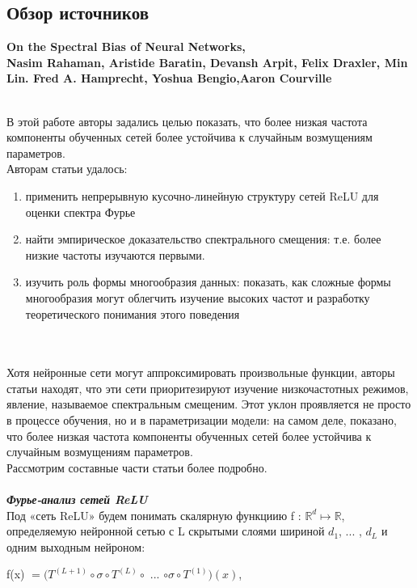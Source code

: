 \documentclass{article}
\begin{document}
    \newpage
    \begin{center} 
    \section{Обзор источников}
    \large \textbf {On the Spectral Bias of Neural Networks, \\ Nasim Rahaman, Aristide Baratin, Devansh Arpit, Felix Draxler, Min Lin. Fred A. Hamprecht, Yoshua Bengio,Aaron Courville}    
    \end{center}
    \\
    \large 
    В этой работе авторы задались целью показать, что более низкая частота компоненты обученных сетей более устойчива к случайным возмущениям параметров. 
    \\
    Авторам статьи удалось:
    \begin{enumerate}
    \item применить непрерывную кусочно-линейную структуру сетей ReLU для оценки спектра Фурье
    \item найти эмпирическое доказательство спектрального смещения: т.е. более низкие частоты изучаются первыми. 
    \item изучить роль формы многообразия данных: показать, как сложные формы многообразия могут облегчить изучение высоких частот и разработку теоретического понимания этого поведения
    \end{enumerate}
    \\ \\
    Хотя нейронные сети могут аппроксимировать произвольные функции, авторы статьи находят, что эти сети приоритезируют изучение низкочастотных режимов, явление, называемое спектральным смещеним. Этот уклон проявляется не просто в процессе обучения, но и в параметризации модели: на самом деле, показано, что более низкая частота компоненты обученных сетей более устойчива к случайным возмущениям параметров.
    \\
    Рассмотрим составные части статьи более подробно.
    \\ \\
    \textbf {\textit{Фурье-анализ сетей ReLU}}
    \\
    Под «сеть ReLU» будем понимать скалярную функциию f : ${\mathbb{R}}^{d} \mapsto {\mathbb{R}}$, определяемую нейронной сетью с L скрытыми слоями шириной $d_1$, ... , $d_L$ и одним выходным нейроном:
    \\
    \begin{center} 
    f(x) $= (T^{(L+1)} \circ \sigma \circ T^{(L)} \circ $ ... $ \circ \sigma \circ T^{(1)})(x)$,
    \end{center}
\end{document}
